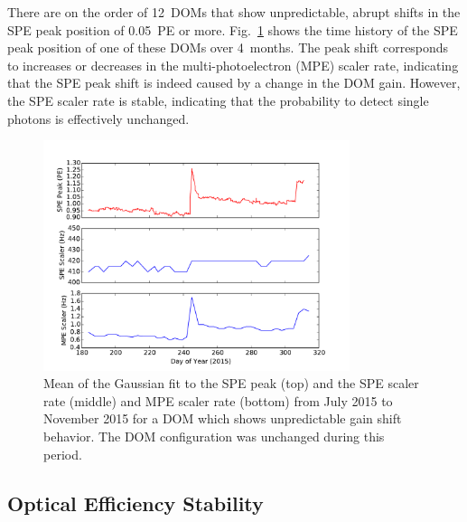 There are on the order of 12~DOMs that show unpredictable, abrupt shifts in the SPE peak
position of 0.05~PE or more. Fig.~\ref{fig:gainshift_spe} shows the time history of the
SPE peak position of one of these DOMs over 4~months. The peak shift
corresponds to increases or decreases in the multi-photoelectron (MPE) scaler rate,
indicating that the SPE peak shift is indeed caused by a change in the DOM
gain. However, the SPE scaler rate is stable, indicating that the
probability to detect single photons is effectively unchanged.

\begin{figure}[!h]
 \centering
 \includegraphics[width=0.8\textwidth]{graphics/dom/reliability/gainshift.pdf}
 \caption{Mean of the Gaussian fit to the SPE peak (top) and the SPE
   scaler rate (middle) and MPE
   scaler rate (bottom) from July 2015 to November 2015 for a DOM
   which shows unpredictable gain shift behavior. The DOM
   configuration was unchanged during this period.}
 \label{fig:gainshift_spe}
\end{figure}

\subsection{\label{sec:optical_stability}Optical Efficiency Stability}

